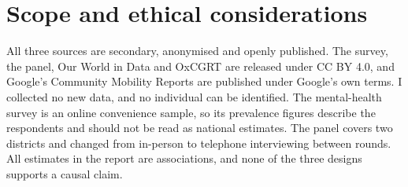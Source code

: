 \section{Scope and ethical considerations}
All three sources are secondary, anonymised and openly published. The survey, the panel, Our World in Data and OxCGRT are released under CC BY 4.0, and Google's Community Mobility Reports are published under Google's own terms. I collected no new data, and no individual can be identified. The mental-health survey is an online convenience sample, so its prevalence figures describe the respondents and should not be read as national estimates. The panel covers two districts and changed from in-person to telephone interviewing between rounds. All estimates in the report are associations, and none of the three designs supports a causal claim.

